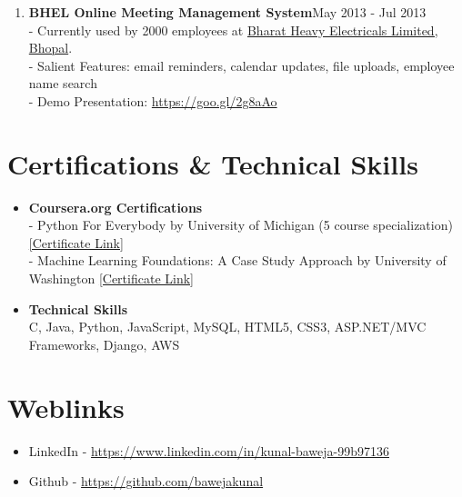 \documentclass{article}
\begin{document}
\begin{enumerate}
    \item \textbf{BHEL Online Meeting Management System}{\hfill May 2013 - Jul 2013}\\
    - Currently used by 2000 employees at \href{https://www.bhelbpl.co.in/bplweb_new/}{Bharat Heavy Electricals Limited, Bhopal}.\\
    - Salient Features: email reminders, calendar updates, file uploads, employee name search\\
    - Demo Presentation: \href{https://goo.gl/2g8aAo}{https://goo.gl/2g8aAo}
    
\end{enumerate}


\section*{Certifications \& Technical Skills}
\begin{itemize}
    \item \textbf{Coursera.org Certifications}\\
    - Python For Everybody by University of Michigan (5 course specialization) \href{https://www.coursera.org/account/accomplishments/specialization/2B5PCJGZ9WEE}{[Certificate Link]}\\
    - Machine Learning Foundations: A Case Study Approach by University of Washington \href{https://www.coursera.org/account/accomplishments/certificate/NDVXWMCYKX9N}{[Certificate Link]}
    
    \item \textbf{Technical Skills}\\
    C, Java, Python, JavaScript, MySQL, HTML5, CSS3, ASP.NET/MVC Frameworks, Django, AWS
\end{itemize}

\section*{Weblinks}
\begin{itemize}
        \setlength{\itemsep 0pt}
        \item LinkedIn - \href{https://www.linkedin.com/in/kunal-baweja-99b97136}{https://www.linkedin.com/in/kunal-baweja-99b97136}
        \item Github - \href{https://github.com/bawejakunal}{https://github.com/bawejakunal}
\end{itemize}
\end{document}
